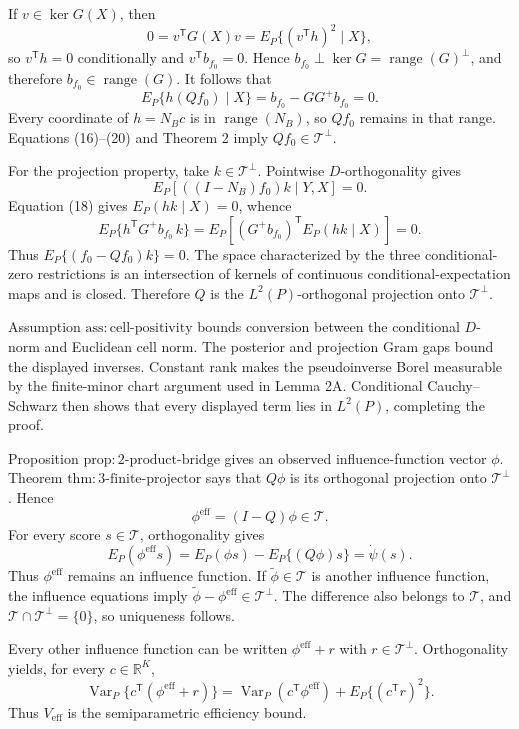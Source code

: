 If \(v\in\ker G(X)\), then
\[
 0=v^{\mathsf T}G(X)v=E_P\{(v^{\mathsf T}h)^2\mid X\}, \tag{19}
\]
so \(v^{\mathsf T}h=0\) conditionally and \(v^{\mathsf T}b_{f_0}=0\).  Hence
\(b_{f_0}\perp\ker G=\operatorname{range}(G)^\perp\), and therefore \(b_{f_0}\in\operatorname{range}(G)\).  It follows that
\[
 E_P\{h(Qf_0)\mid X\}
 =b_{f_0}-GG^+b_{f_0}=0. \tag{20}
\]
Every coordinate of \(h=N_Bc\) is in \(\operatorname{range}(N_B)\), so \(Qf_0\) remains in that range.  Equations (16)--(20) and Theorem 2 imply \(Qf_0\in\mathcal T^\perp\).

For the projection property, take \(k\in\mathcal T^\perp\).  Pointwise \(D\)-orthogonality gives
\[
 E_P[((I-N_B)f_0)k\mid Y,X]=0. \tag{21}
\]
Equation (18) gives \(E_P(hk\mid X)=0\), whence
\[
 E_P\{h^{\mathsf T}G^+b_{f_0}\,k\}
 =E_P[(G^+b_{f_0})^{\mathsf T}E_P(hk\mid X)]=0. \tag{22}
\]
Thus \(E_P\{(f_0-Qf_0)k\}=0\).  The space characterized by the three conditional-zero restrictions is an intersection of kernels of continuous conditional-expectation maps and is closed.  Therefore \(Q\) is the \(L^2(P)\)-orthogonal projection onto \(\mathcal T^\perp\).

Assumption \(\mathrm{ass{:}cell\mbox{-}positivity}\) bounds conversion between the conditional \(D\)-norm and Euclidean cell norm.  The posterior and projection Gram gaps bound the displayed inverses.  Constant rank makes the pseudoinverse Borel measurable by the finite-minor chart argument used in Lemma 2A.  Conditional Cauchy--Schwarz then shows that every displayed term lies in \(L^2(P)\), completing the proof.

Proposition \(\mathrm{prop{:}2\mbox{-}product\mbox{-}bridge}\) gives an observed influence-function vector \(\phi\).  Theorem \(\mathrm{thm{:}3\mbox{-}finite\mbox{-}projector}\) says that \(Q\phi\) is its orthogonal projection onto \(\mathcal T^\perp\).  Hence
\[
 \phi^{\mathrm{eff}}=(I-Q)\phi\in\mathcal T. \tag{23}
\]
For every score \(s\in\mathcal T\), orthogonality gives
\[
 E_P(\phi^{\mathrm{eff}}s)
 =E_P(\phi s)-E_P\{(Q\phi)s\}
 =\dot\psi(s). \tag{24}
\]
Thus \(\phi^{\mathrm{eff}}\) remains an influence function.  If \(\widetilde\phi\in\mathcal T\) is another influence function, the influence equations imply
\(\widetilde\phi-\phi^{\mathrm{eff}}\in\mathcal T^\perp\).  The difference also belongs to \(\mathcal T\), and \(\mathcal T\cap\mathcal T^\perp=\{0\}\), so uniqueness follows.

Every other influence function can be written \(\phi^{\mathrm{eff}}+r\) with \(r\in\mathcal T^\perp\).  Orthogonality yields, for every \(c\in\mathbb R^K\),
\[
 \operatorname{Var}_P\{c^{\mathsf T}(\phi^{\mathrm{eff}}+r)\}
 =\operatorname{Var}_P(c^{\mathsf T}\phi^{\mathrm{eff}})
  +E_P\{(c^{\mathsf T}r)^2\}. \tag{25}
\]
Thus \(V_{\mathrm{eff}}\) is the semiparametric efficiency bound.


